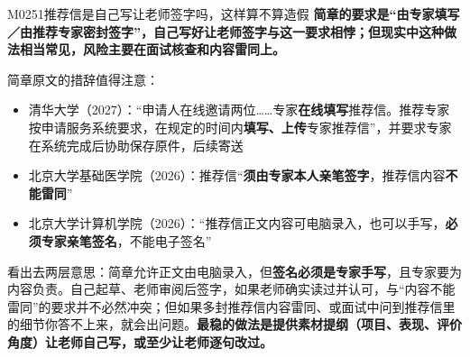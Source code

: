 \begin{qa}{M0251}{推荐信是自己写让老师签字吗，这样算不算造假}
\textbf{简章的要求是“由专家填写／由推荐专家密封签字”，自己写好让老师签字与这一要求相悖；但现实中这种做法相当常见，风险主要在面试核查和内容雷同上。}

简章原文的措辞值得注意：

\begin{itemize}
  \item 清华大学（2027）：“申请人在线邀请两位……专家\textbf{在线填写}推荐信。推荐专家按申请服务系统要求，在规定的时间内\textbf{填写、上传}专家推荐信”，并要求专家在系统完成后协助保存原件，后续寄送
  \item 北京大学基础医学院（2026）：推荐信“\textbf{须由专家本人亲笔签字}，推荐信内容\textbf{不能雷同}”
  \item 北京大学计算机学院（2026）：“推荐信正文内容可电脑录入，也可以手写，\textbf{必须专家亲笔签名}，不能电子签名”
\end{itemize}

看出去两层意思：简章允许正文由电脑录入，但\textbf{签名必须是专家手写}，且专家要为内容负责。自己起草、老师审阅后签字，如果老师确实读过并认可，与“内容不能雷同”的要求并不必然冲突；但如果多封推荐信内容雷同、或面试中问到推荐信里的细节你答不上来，就会出问题。\textbf{最稳的做法是提供素材提纲（项目、表现、评价角度）让老师自己写，或至少让老师逐句改过。}
\end{qa}

